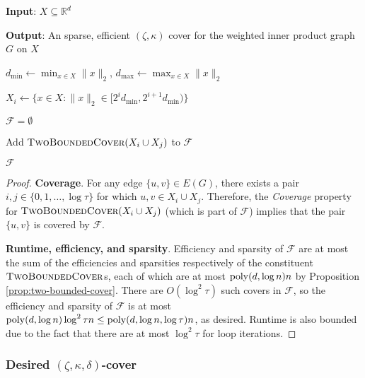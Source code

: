 \begin{algorithm}[!h]\caption{}
\begin{algorithmic}[1]

    \State \textbf{Input}: $X\subseteq \mathbb{R}^d$
    
    \State \textbf{Output}: An sparse, efficient $(\zeta,\kappa)$ cover for the weighted inner product graph $G$ on $X$
    
    \State $d_{\min}\gets \min_{x\in X} \|x\|_2$, $d_{\max}\gets \max_{x\in X} \|x\|_2$
    
    
        $X_i\gets \{x\in X: \|x\|_2\in [2^i d_{\min}, 2^{i+1}d_{\min})\}$
    
    \EndFor
    
    \State $\mathcal F = \emptyset$
    
    
        \State Add $\textsc{TwoBoundedCover}(X_i\cup X_j)$ to $\mathcal F$
    
    \EndFor
    
    \State \Return $\mathcal F$
    
\EndProcedure
\end{algorithmic}
\end{algorithm}

\begin{proof}
\textbf{Coverage}. For any edge $\{u,v\}\in E(G)$, there exists a pair $i,j\in \{0,1,\hdots,\log \tau\}$ for which $u,v\in X_i\cup X_j$. Therefore, the \emph{Coverage} property for $\textsc{TwoBoundedCover}(X_i\cup X_j)$ (which is part of $\mathcal F$) implies that the pair $\{u,v\}$ is covered by $\mathcal F$.

\textbf{Runtime, efficiency, and sparsity}. Efficiency and sparsity of $\mathcal F$ are at most the sum of the efficiencies and sparsities respectively of the constituent $\textsc{TwoBoundedCover}$s, each of which are at most $\mathrm{poly}(d,\log n) n$ by Proposition \ref{prop:two-bounded-cover}. There are $O(\log^2 \tau)$ such covers in $\mathcal F$, so the efficiency and sparsity of $\mathcal F$ is at most $\mathrm{poly}(d,\log n)\log^2 \tau n\le \mathrm{poly}(d,\log n,\log \tau) n$, as desired. Runtime is also bounded due to the fact that there are at most $\log^2 \tau$ for loop iterations.
\end{proof}

\subsubsection{Desired \texorpdfstring{$(\zeta,\kappa,\delta)$}{}-cover}

